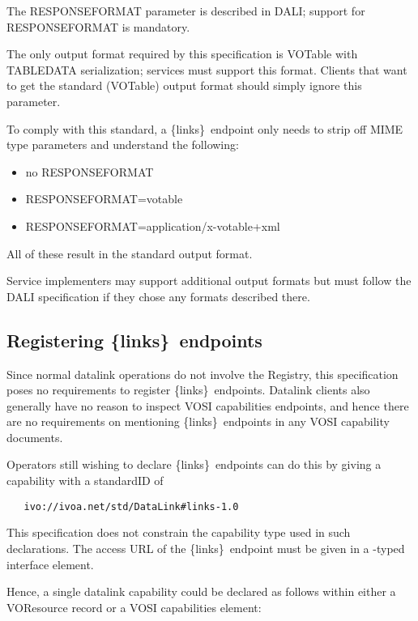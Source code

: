 \documentclass[11pt,a4paper]{ivoa}
\newcommand{\blinks}{\{links\}}
\begin{document}
The RESPONSEFORMAT parameter is described in DALI;
support for RESPONSEFORMAT is mandatory.

The only output format required by this specification is VOTable with
TABLEDATA serialization; services must support this format. Clients
that want to get the standard (VOTable) output format should simply
ignore this parameter.

To comply with this standard, a \blinks\ endpoint only needs to strip
off MIME type parameters and understand the following:
\begin{itemize}
  \item no RESPONSEFORMAT
  \item RESPONSEFORMAT=votable
  \item RESPONSEFORMAT=application/x-votable+xml
\end{itemize}
All of these result in the standard output format.

Service implementers may support additional output formats but must follow
the DALI specification if they chose any formats described there.


\subsection{Registering \blinks~endpoints}

Since normal datalink operations do not involve the Registry, this
specification poses no requirements to register \blinks~endpoints.
Datalink clients also generally have no reason to inspect VOSI
capabilities endpoints, and hence there are no requirements on
mentioning \blinks~endpoints in any VOSI capability documents.

Operators still wishing to declare \blinks~endpoints can do this by
giving a capability with a standardID of
\begin{verbatim}
   ivo://ivoa.net/std/DataLink#links-1.0
\end{verbatim}

This specification does not constrain the capability type used in such
declarations.  The access URL of the \blinks~endpoint must be given in a
-typed interface element.

Hence, a single datalink capability could be declared as follows within
either a VOResource record or a VOSI capabilities element:
\end{document}
